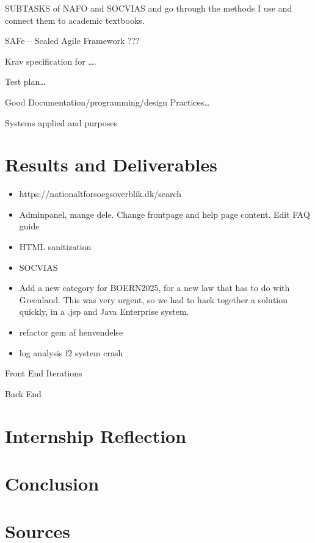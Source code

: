 \documentclass[../main.tex]{subfiles}
\begin{document}
SUBTASKS of NAFO and SOCVIAS and go through the methods I use and connect them to academic textbooks.  

SAFe – Scaled Agile Framework ??? 

Krav specification for …. 

Test plan… 

Good Documentation/programming/design Practices… 

Systems applied and purposes 
\section{Results and Deliverables}

\begin{itemize}
    \item https://nationaltforsoegsoverblik.dk/search 
    \item Adminpanel, mange dele. Change frontpage and help page content. Edit FAQ guide 
    \item HTML sanitization 
    \item SOCVIAS 
    \item Add a new category for BOERN2025, for a new law that has to do with Greenland. This was very urgent, so we had to hack together a solution quickly, in a .jsp and Java Enterprise system. 
    \item refactor gem af henvendelse
    \item log analysis f2 system crash
\end{itemize}


Front End Iterations 

Back End 
\section{Internship Reflection}

\section{Conclusion}

\section{Sources}
\end{document}
